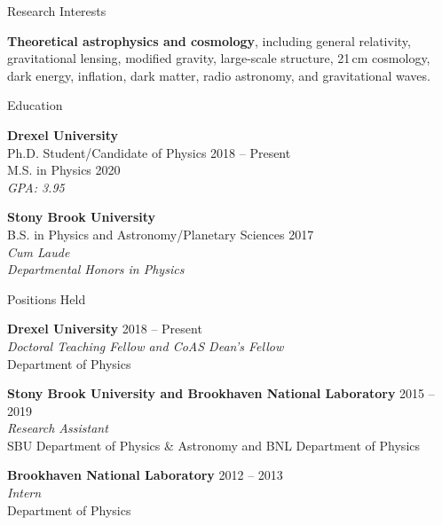 \documentclass{resume} %
\begin{document}


\begin{rSection}{Research Interests}

\textbf{Theoretical astrophysics and cosmology}, including general relativity, gravitational lensing, modified gravity, large-scale structure, 21\,cm cosmology, dark energy, inflation, dark matter, radio astronomy, and gravitational waves. 

\end{rSection}


\begin{rSection}{Education}

\textbf{Drexel University} \\%
{\color{MidnightBlue} Ph.D.} Student/Candidate of Physics \hfill {2018 -- Present} \\
{\color{MidnightBlue} M.S.} in Physics \hfill{2020}\\
\textit{GPA: 3.95}

\textbf{Stony Brook University} \\%
{\color{MidnightBlue} B.S.} in Physics and Astronomy/Planetary Sciences \hfill{2017}\\
\textit{Cum Laude}\\
\textit{Departmental Honors in Physics}

\end{rSection}


\begin{rSection}{Positions Held}

\textbf{Drexel University} \hfill {2018 -- Present} \\
\textit{Doctoral Teaching Fellow and CoAS Dean's Fellow}\\
Department of Physics

\textbf{Stony Brook University and Brookhaven National Laboratory} \hfill {2015 -- 2019}\\
\textit{Research Assistant}\\
SBU Department of Physics \& Astronomy  and BNL Department of Physics

\textbf{Brookhaven National Laboratory} \hfill {2012 -- 2013}\\
\textit{Intern}\\
Department of Physics

\end{rSection}
\end{document}

